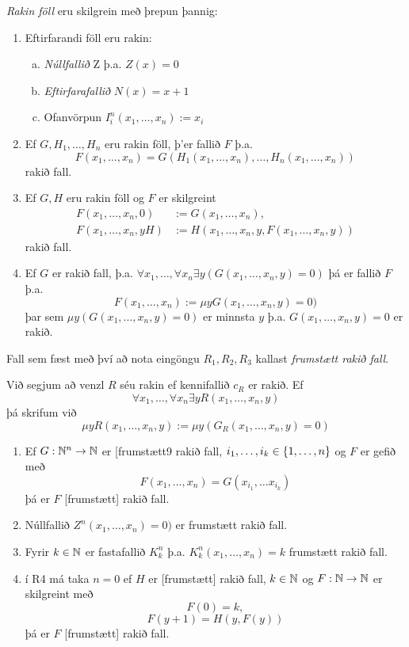 \documentclass[12pt]{book}
\newcommand{\xxn}{x_1, \dotsc, x_n}
\begin{document}
\begin{skgr}
  \emph{Rakin föll} eru skilgrein með þrepun þannig:

  \begin{enumerate}[R\arabic*]
  \item  Eftirfarandi föll eru rakin:
    \begin{enumerate}[(a)]
    \item \emph{Núllfallið} Z þ.a. $Z(x) = 0$
    \item \emph{Eftirfarafallið} $N(x) = x+1$
    \item Ofanvörpun $I_i^n(x_1, \dotsc, x_n) := x_i$
    \end{enumerate}
  \item Ef $G,H_1, \dotsc, H_n$ eru rakin föll, þ'er fallið
    $F$ þ.a.
    \[ F(x_1,\dotsc,x_n) = G(H_1(x_1,\dotsc,x_n), \dotsc, H_n(x_1,\dotsc,x_n))\]
    rakið fall.
  \item Ef $G,H$ eru rakin föll og $F$ er skilgreint
    \begin{align*}
      F(x_1, \dotsc, x_n,0) & := G(x_1, \dotsc,x_n),\\
      F(x_1, \dotsc,x_n, yH) & := H(x_1, \dotsc, x_n, y, F(x_1, \dotsc, x_n, y))
    \end{align*}
    rakið fall.
  \item Ef $G$ er rakið fall, þ.a. $\forall x_1, \dotsc, \forall x_n  \exists y (G(x_1, \dotsc, x_n,y) = 0)$
    þá er fallið $F$ þ.a. 
    \[ F(x_1, \dotsc, x_n) := \mu y G(x_1, \dotsc, x_n,y) = 0)\]
    þar sem $\mu y(G(x_1,\dotsc,x_n,y) = 0)$ er minnsta $y$ þ.a.
    $G(x_1,\dotsc,x_n,y) = 0$ er rakið.
  \end{enumerate}

 Fall sem fæst með því að nota eingöngu $R_1, R_2, R_3$ 
 kallast \emph{frumstætt rakið fall}.

 Við segjum að venzl $R$ séu rakin ef kennifallið 
 $c_R$ er rakið. Ef \[\forall x_1, \dotsc, \forall x_n  \exists y R(x_1, \dotsc, x_n,y)\]
 þá skrifum við
 \[\mu y R (x_1, \dotsc, x_n,y) := \mu y (G_R(x_1,\dotsc,x_n,y) = 0)\]
\end{skgr}


\begin{setn}
  \begin{enumerate}(1)
  \item Ef $G: \mathbb{N}^n \to \mathbb{N}$ er [frumstætt9 rakið fall,
    $i_1, \dotsc, i_k \in \{1, \dotsc, n\}$ og $F$ er gefið með
    \[ F(x_1, \dotsc,x_n) = G(x_{i_1}, \dotsc x_{i_k})\]
    þá er $F$ [frumstætt] rakið fall.
  \item Núllfallið $Z^n(x_1,\dotsc,x_n) = 0)$ er frumstætt rakið fall.
  \item Fyrir $k \in \mathbb{N}$ er fastafallið $K^n_k$ þ.a.
    $K^n_k ( \xxn) = k$ frumstætt rakið fall.
  \item í R4 má taka $n=0$ ef $H$ er [frumstætt] rakið fall,
    $k \in \mathbb{N}$ og $F: \mathbb{N} \to \mathbb{N}$ er skilgreint með
    \[ F(0) = k,\]
    \[ F(y+1) = H(y,F(y)) \]
    þá er $F$ [frumstætt] rakið fall.
  \end{enumerate}
\end{setn}
\end{document}
